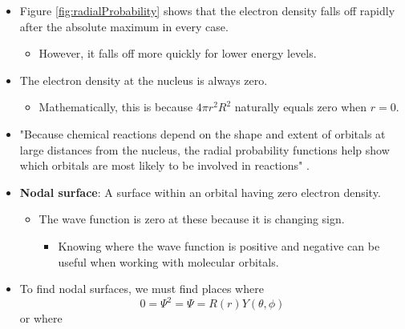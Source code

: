 \documentclass[../notes.tex]{subfiles}
\begin{document}
\begin{itemize}
\begin{itemize}
        \item Its value is $a_0=\SI{52.9}{\pico\meter}$.
        \item It is a common unit in quantum mechanics.
        \item It is used to scale the functions in Figures \ref{fig:radialFunctions} and \ref{fig:radialProbability} to give reasonable axis units\footnote{Errata?: Should the $y$-axis in Figure \ref{fig:radialProbability} be $a_0^3r^2R^2$?}.
    \end{itemize}
    \item Figure \ref{fig:radialProbability} shows that the electron density falls off rapidly after the absolute maximum in every case.
    \begin{itemize}
        \item However, it falls off more quickly for lower energy levels.
    \end{itemize}
    \item The electron density at the nucleus is always zero.
    \begin{itemize}
        \item Mathematically, this is because $4\pi r^2R^2$ naturally equals zero when $r=0$.
    \end{itemize}
    \item "Because chemical reactions depend on the shape and extent of orbitals at large distances from the nucleus, the radial probability functions help show which orbitals are most likely to be involved in reactions" \parencite[23]{bib:MiesslerFischerTarr}.
    \item {}\textbf{Nodal surface}: A surface within an orbital having zero electron density.
    \begin{itemize}
        \item The wave function is zero at these because it is changing sign.
        \begin{itemize}
            \item Knowing where the wave function is positive and negative can be useful when working with molecular orbitals.
        \end{itemize}
    \end{itemize}
    \item To find nodal surfaces, we must find places where
    \begin{equation*}
        0 = \Psi^2 = \Psi = R(r)Y(\theta,\phi)
    \end{equation*}
    or where
    \begin{align*}

\end{align*}
\end{itemize}
\end{document}
